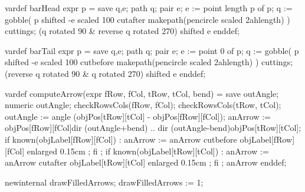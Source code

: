   vardef barHead expr p =
    save q,e; path q; pair e;
    e := point length p of p;
    q := gobble(
      p shifted -e scaled 100
      cutafter makepath(pencircle scaled 2ahlength)
    ) cuttings;
    (q rotated 90 & reverse q rotated 270) shifted e
  enddef;

  vardef barTail expr p =
    save q,e; path q; pair e;
    e := point 0 of p;
    q := gobble(
      p shifted -e scaled 100
      cutbefore makepath(pencircle scaled 2ahlength)
    ) cuttings;
    (reverse q rotated 90 & q rotated 270) shifted e
  enddef;

  vardef computeArrow(expr fRow, fCol, tRow, tCol, bend) =
    save outAngle;
    numeric outAngle;
    checkRowsCols(fRow, fCol);
    checkRowsCols(tRow, tCol);
    outAngle :=
      angle (objPos[tRow][tCol] - objPos[fRow][fCol]);
    anArrow := 
      objPos[fRow][fCol]{dir (outAngle+bend)} .. 
      {dir (outAngle-bend)}objPos[tRow][tCol];
    if known(objLabel[fRow][fCol]) :
      anArrow :=
        anArrow cutbefore
        objLabel[fRow][fCol] enlarged 0.15cm ;
    fi ;
    if known(objLabel[tRow][tCol]) :
      anArrow :=
        anArrow cutafter
        objLabel[tRow][tCol] enlarged 0.15cm ;
    fi ;
    anArrow
  enddef;

  newinternal drawFilledArrows;
  drawFilledArrows := 1;
  
